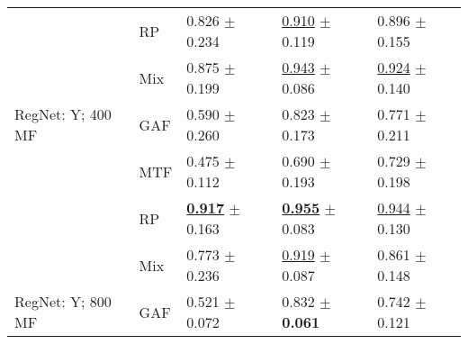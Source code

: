 \begin{tabular}[t]{lllll}
 & RP & \textcolor[rgb]{0.1764705882,0.5000000000,0}{0.826} $\pm$ \textcolor[rgb]{0.8366600265,0.1633399735,0}{0.234} & \underline{\textcolor[rgb]{0.1487383798,0.5000000000,0}{0.910}} $\pm$ \textcolor[rgb]{0.3227135493,0.5000000000,0}{0.119} & \textcolor[rgb]{0.2297120419,0.5000000000,0}{0.896} $\pm$ \textcolor[rgb]{0.2675465965,0.5000000000,0}{0.155} \\
 & Mix & \textcolor[rgb]{0.0808823529,0.5000000000,0}{0.875} $\pm$ \textcolor[rgb]{0.7127864450,0.2872135550,0}{0.199} & \underline{\textcolor[rgb]{0.0398406375,0.5000000000,0}{0.943}} $\pm$ \textcolor[rgb]{0.1408376023,0.5000000000,0}{0.086} & \underline{\textcolor[rgb]{0.1433246073,0.5000000000,0}{0.924}} $\pm$ \textcolor[rgb]{0.1910808871,0.5000000000,0}{0.140} \\
RegNet: Y; 400 MF & GAF & \textcolor[rgb]{0.6335784314,0.3664215686,0}{0.590} $\pm$ \textcolor[rgb]{0.9285640435,0.0714359565,0}{0.260} & \textcolor[rgb]{0.4409030544,0.5000000000,0}{0.823} $\pm$ \textcolor[rgb]{0.6253561540,0.3746438460,0}{0.173} & \textcolor[rgb]{0.6184554974,0.3815445026,0}{0.771} $\pm$ \textcolor[rgb]{0.5365885567,0.4634114433,0}{0.211} \\
 & MTF & \textcolor[rgb]{0.8573529412,0.1426470588,0}{0.475} $\pm$ \textcolor[rgb]{0.3995965707,0.5000000000,0}{0.112} & \textcolor[rgb]{0.8871181939,0.1128818061,0}{0.690} $\pm$ \textcolor[rgb]{0.7368704913,0.2631295087,0}{0.193} & \textcolor[rgb]{0.7480366492,0.2519633508,0}{0.729} $\pm$ \textcolor[rgb]{0.4763768270,0.5000000000,0}{0.198} \\
 & RP & \underline{\textbf{\textcolor[rgb]{0.0000000000,0.5000000000,0}{0.917}}} $\pm$ \textcolor[rgb]{0.5819876952,0.4180123048,0}{0.163} & \underline{\textbf{\textcolor[rgb]{0.0000000000,0.5000000000,0}{0.955}}} $\pm$ \textcolor[rgb]{0.1234823448,0.5000000000,0}{0.083} & \underline{\textcolor[rgb]{0.0785340314,0.5000000000,0}{0.944}} $\pm$ \textcolor[rgb]{0.1425478198,0.5000000000,0}{0.130} \\
 & Mix & \textcolor[rgb]{0.2794117647,0.5000000000,0}{0.773} $\pm$ \textcolor[rgb]{0.8433802953,0.1566197047,0}{0.236} & \underline{\textcolor[rgb]{0.1195219124,0.5000000000,0}{0.919}} $\pm$ \textcolor[rgb]{0.1448309804,0.5000000000,0}{0.087} & \textcolor[rgb]{0.3376963351,0.5000000000,0}{0.861} $\pm$ \textcolor[rgb]{0.2311964710,0.5000000000,0}{0.148} \\
RegNet: Y; 800 MF & GAF & \textcolor[rgb]{0.7683823529,0.2316176471,0}{0.521} $\pm$ \textcolor[rgb]{0.2579384773,0.5000000000,0}{0.072} & \textcolor[rgb]{0.4095617530,0.5000000000,0}{0.832} $\pm$ \textbf{\textcolor[rgb]{0.0000000000,0.5000000000,0}{0.061}} & \textcolor[rgb]{0.7091623037,0.2908376963,0}{0.742} $\pm$ \textcolor[rgb]{0.0987377946,0.5000000000,0}{0.121} \\

\end{tabular}

